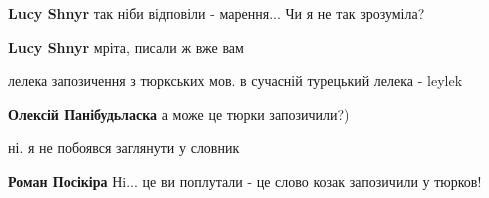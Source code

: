 \begin{itemize}
\begin{itemize}
\textbf{Lucy Shnyr} так ніби відповіли - марення... Чи я не так зрозуміла?

 
\textbf{Lucy Shnyr} мріта, писали ж вже вам
\end{itemize}

 
лелека запозичення з тюркських мов. в сучасній турецький лелека - leylek

\begin{itemize}
 
\textbf{Олексій Панібудьласка} а може це тюрки запозичили?)

 
ні. я не побоявся заглянути у словник

 
\textbf{Роман Посікіра} Нi... це ви поплутали - це слово козак запозичили у тюрков!
\end{itemize}

 

\end{itemize}
